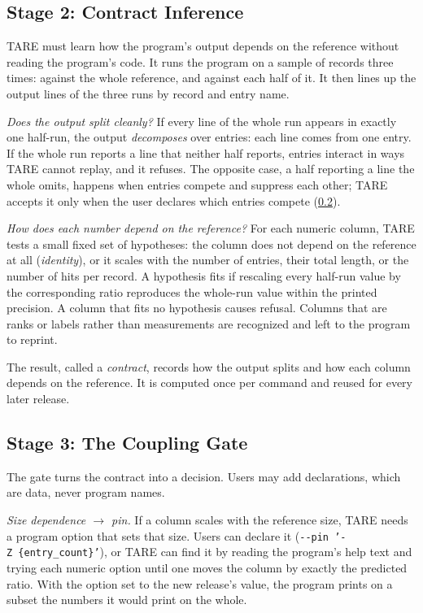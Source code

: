 \documentclass[letterpaper,twocolumn,10pt]{article}
\theoremstyle{definition}
\newcommand{\sys}{TARE\xspace}
\begin{document}
\subsection{Stage 2: Contract Inference}
\label{sec:contract}

\sys must learn how the program's output depends on the reference without reading the program's code. It runs the
program on a sample of records three times: against the whole reference, and against each half of it. It then lines
up the output lines of the three runs by record and entry name.

\textit{Does the output split cleanly?} If every line of the whole run appears in exactly one half-run, the output
\textit{decomposes} over entries: each line comes from one entry. If the whole run reports a line that neither half
reports, entries interact in ways \sys cannot replay, and it refuses. The opposite case, a half reporting a line the
whole omits, happens when entries compete and suppress each other; \sys accepts it only when the user declares which
entries compete (\cref{sec:gate}).

\textit{How does each number depend on the reference?} For each numeric column, \sys tests a small fixed set of
hypotheses: the column does not depend on the reference at all (\textit{identity}), or it scales with the number of
entries, their total length, or the number of hits per record. A hypothesis fits if rescaling every half-run value by
the corresponding ratio reproduces the whole-run value within the printed precision. A column that fits no hypothesis
causes refusal. Columns that are ranks or labels rather than measurements are recognized and left to the program to
reprint.

The result, called a \textit{contract}, records how the output splits and how each column depends on the reference.
It is computed once per command and reused for every later release.

\subsection{Stage 3: The Coupling Gate}
\label{sec:gate}

The gate turns the contract into a decision. Users may add declarations, which are data, never program names.

\textit{Size dependence $\rightarrow$ pin.} If a column scales with the reference size, \sys needs a program option that
sets that size. Users can declare it (\texttt{-{}-pin~'-Z~\{entry\_count\}'}), or \sys can find it by reading the
program's help text and trying each numeric option until one moves the column by exactly the predicted ratio. With
the option set to the new release's value, the program prints on a subset the numbers it would print on the whole.
\end{document}
